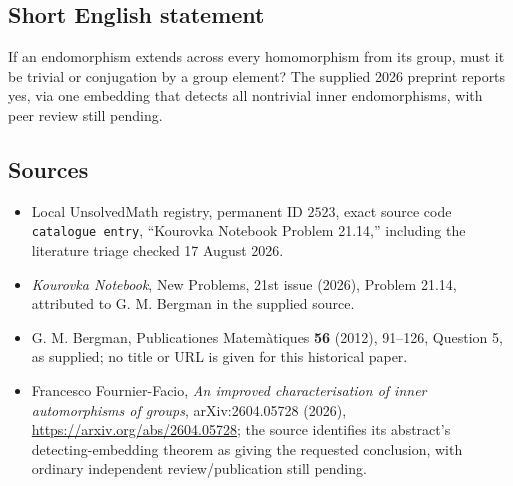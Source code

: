 \documentclass[11pt]{article}
\begin{document}
\subsection{Short English statement}
If an endomorphism extends across every homomorphism from its group, must it be trivial or conjugation by a group element? The supplied 2026 preprint reports yes, via one embedding that detects all nontrivial inner endomorphisms, with peer review still pending.
\subsection{Sources}
\begin{itemize}
\item Local UnsolvedMath registry, permanent ID $2523$, exact source code \texttt{catalogue entry}, ``Kourovka Notebook Problem 21.14,'' including the literature triage checked 17 August 2026.
\item \emph{Kourovka Notebook}, New Problems, 21st issue (2026), Problem 21.14, attributed to G. M. Bergman in the supplied source.
\item G. M. Bergman, Publicationes Matem\`atiques \textbf{56} (2012), 91--126, Question 5, as supplied; no title or URL is given for this historical paper.
\item Francesco Fournier-Facio, \emph{An improved characterisation of inner automorphisms of groups}, arXiv:2604.05728 (2026), \url{https://arxiv.org/abs/2604.05728}; the source identifies its abstract's detecting-embedding theorem as giving the requested conclusion, with ordinary independent review/publication still pending.
\end{itemize}
\end{document}
